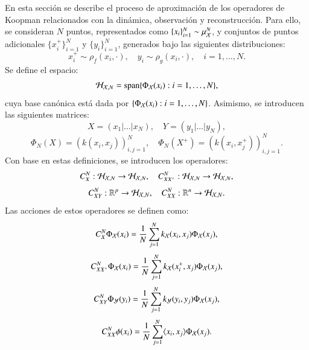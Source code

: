 	En esta sección se describe el proceso de aproximación de los operadores de Koopman relacionados con la dinámica, observación y reconstrucción. Para ello, se consideran \( N \) puntos, representados como \( \{ x_i \}_{i=1}^N \sim \mu_{\mathcal{X}}^N \), y conjuntos de puntos adicionales \( \{ x^+_i \}_{i=1}^N \) y \( \{ y_i \}_{i=1}^N \), generados bajo las siguientes distribuciones:
\begin{equation*}
    x^+_i \sim \rho_f (x_i, \cdot), \quad y_i \sim \rho_g (x_i, \cdot), \quad i = 1, \dots, N.
\end{equation*}
Se define el espacio:
\begin{equation*}
    \mathcal{H}_{\mathcal{X}, N} = \text{span} \{\Phi_{\mathcal{X}} (x_i) : i = 1, \dots, N \},
\end{equation*}
cuya base canónica está dada por \( \{\Phi_{\mathcal{X}} (x_i) : i = 1, \dots, N \} \). 
Asimismo, se introducen las siguientes matrices:
\begin{equation*}
    X = (x_{1} | \dots | x_N), \quad Y = (y_1 | \dots | y_N),
\end{equation*}
\begin{equation*}
    \Phi_N (X) = (k(x_i, x_j))_{i,j = 1}^N, \quad \Phi_N (X^+) = (k(x_i, x^+_j))_{i,j = 1}^N.
\end{equation*}
Con base en estas definiciones, se introducen los operadores:
\begin{equation*}
    C_{X}^N : \mathcal{H}_{\mathcal{X}, N} \to \mathcal{H}_{\mathcal{X}, N}, \quad C_{XX^+}^N : \mathcal{H}_{\mathcal{X}, N} \to \mathcal{H}_{\mathcal{X}, N},
\end{equation*}
\begin{equation*}
    C_{XY}^N : \mathbb{R}^p \to \mathcal{H}_{\mathcal{X}, N}, \quad C_{XX}^N : \mathbb{R}^n \to \mathcal{H}_{\mathcal{X}, N}.
\end{equation*}
Las acciones de estos operadores se definen como:
\begin{equation*}
    C_{X}^N \Phi_{\mathcal{X}} (x_i) = \frac{1}{N} \sum_{j = 1}^N k_{\mathcal{X}}(x_i, x_j) \Phi_{\mathcal{X}} (x_j),
\end{equation*}
\begin{equation*}
    C_{XX^+}^N \Phi_{\mathcal{X}} (x_i) = \frac{1}{N} \sum_{j = 1}^N k_{\mathcal{X}}(x_i^+, x_j) \Phi_{\mathcal{X}} (x_j),
\end{equation*}
\begin{equation*}
    C_{XY}^N \Phi_{\mathcal{Y}} (y_i) = \frac{1}{N} \sum_{j = 1}^N k_{\mathcal{Y}} (y_i, y_j) \Phi_{\mathcal{X}} (x_j),
\end{equation*}
\begin{equation*}
    C_{XX}^N \phi (x_i) = \frac{1}{N} \sum_{j = 1}^N \langle x_i, x_j \rangle \Phi_{\mathcal{X}} (x_j).
\end{equation*}
